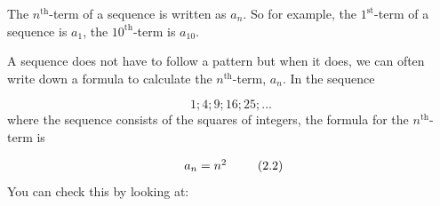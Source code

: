       \label{m39362*eip-149}The ${n}^{\mathrm{th}}$-term of a sequence is written as ${a}_{n}$. So for example, the ${1}^{\mathrm{st}}$-term of a sequence is ${a}_{1}$, the ${10}^{\mathrm{th}}$-term is ${a}_{10}$.\par \label{m39362*id63992}A sequence does not have to follow a pattern but when it does, we can often write down a formula to calculate the ${n}^{\mathrm{th}}$-term, ${a}_{n}$. In the sequence\par 
      \label{m39362*id64025}\nopagebreak\noindent{}
        
    \begin{equation}
    1;4;9;16;25;...\tag{2.1}
      \end{equation}
      \label{m39362*id64058}where the sequence consists of the squares of integers, the formula for the ${n}^{\mathrm{th}}$-term is\par 
      \label{m39362*uid15}\nopagebreak\noindent{}
        
    \begin{equation}
    \begin{array}{cc}\hfill {a}_{n}={n}^{2}\end{array}\tag{2.2}
      \end{equation}
      \label{m39362*id64117}You can check this by looking at:\par 
      \label{m39362*id64122}\nopagebreak\noindent{}
        

